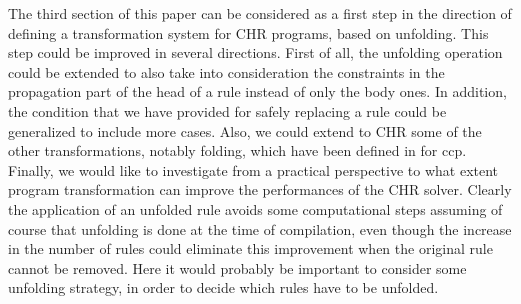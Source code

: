 \documentclass[final]{acmtrans2e}
\begin{document}
The third section of this paper can be considered as a first step
in the direction of defining a transformation system for CHR programs,
based on unfolding. This step could be improved in several directions.
First of all, the unfolding operation could be extended to also take
into consideration the constraints in the propagation part of the head
of a rule instead of only the body ones.
In addition, the condition that we have provided for safely
replacing a rule could be generalized to include more cases.
Also, we could extend to CHR some of the other transformations,
notably folding, which have been defined  in \cite{EGM01} for ccp.
Finally, we would like to investigate from a practical perspective
to what extent program transformation can improve the
performances of the CHR solver. Clearly the application of an
unfolded rule avoids some computational steps assuming of course that
unfolding is done at the time of compilation, even though the
increase in the number of rules could eliminate this improvement
when the original rule cannot be removed.
Here it would probably be important to consider some unfolding
strategy, in order to decide which rules have to be unfolded.
\end{document}
